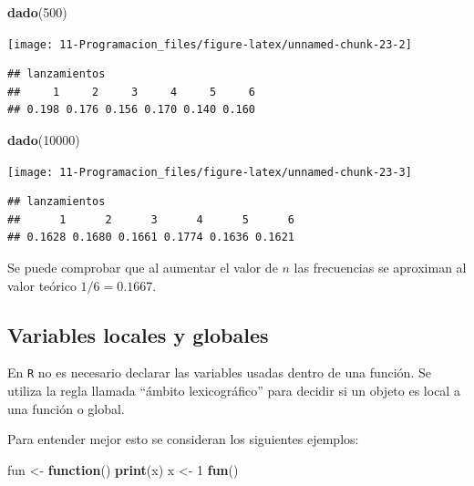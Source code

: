 \documentclass[]{book}
\newenvironment{Shaded}{\begin{snugshade}}{\end{snugshade}}
\newcommand{\ControlFlowTok}[1]{\textcolor[rgb]{0.13,0.29,0.53}{\textbf{#1}}}
\newcommand{\DecValTok}[1]{\textcolor[rgb]{0.00,0.00,0.81}{#1}}
\newcommand{\KeywordTok}[1]{\textcolor[rgb]{0.13,0.29,0.53}{\textbf{#1}}}
\newcommand{\NormalTok}[1]{#1}
\newcommand{\StringTok}[1]{\textcolor[rgb]{0.31,0.60,0.02}{#1}}
\begin{document}
\begin{Shaded}
\begin{Highlighting}[]
\KeywordTok{dado}\NormalTok{(}\DecValTok{500}\NormalTok{)}
\end{Highlighting}
\end{Shaded}

\begin{center}\texttt{[image: 11-Programacion\_files/figure-latex/unnamed-chunk-23-2]} \end{center}

\begin{verbatim}
## lanzamientos
##     1     2     3     4     5     6 
## 0.198 0.176 0.156 0.170 0.140 0.160
\end{verbatim}

\begin{Shaded}
\begin{Highlighting}[]
\KeywordTok{dado}\NormalTok{(}\DecValTok{10000}\NormalTok{)}
\end{Highlighting}
\end{Shaded}

\begin{center}\texttt{[image: 11-Programacion\_files/figure-latex/unnamed-chunk-23-3]} \end{center}

\begin{verbatim}
## lanzamientos
##      1      2      3      4      5      6 
## 0.1628 0.1680 0.1661 0.1774 0.1636 0.1621
\end{verbatim}

Se puede comprobar que al aumentar el valor de \(n\) las frecuencias se
aproximan al valor teórico \(1/6=0.1667\).

\hypertarget{variables-locales-y-globales}{%
\subsection{Variables locales y globales}\label{variables-locales-y-globales}}

En \texttt{R} no es
necesario declarar las variables usadas dentro de una función. Se
utiliza la regla llamada ``ámbito lexicográfico'' para decidir si un
objeto es local a una función o global.

Para entender mejor esto se consideran los siguientes ejemplos:

\begin{Shaded}
\begin{Highlighting}[]
\NormalTok{fun <-}\StringTok{ }\ControlFlowTok{function}\NormalTok{() }\KeywordTok{print}\NormalTok{(x)}
\NormalTok{x <-}\StringTok{ }\DecValTok{1}
\KeywordTok{fun}\NormalTok{()}
\end{Highlighting}
\end{Shaded}
\end{document}
